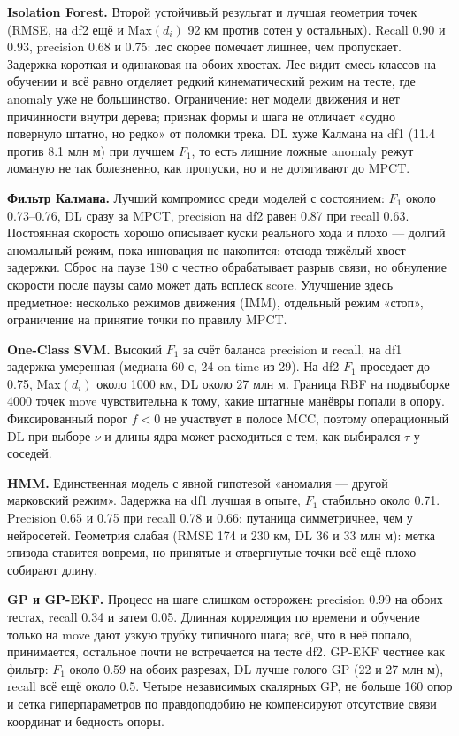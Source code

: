 \documentclass[a4paper,12pt]{report}
\begin{document}
\textbf{Isolation Forest.} Второй устойчивый результат и лучшая геометрия точек (RMSE, на df2 ещё и Max$(d_i)$ 92 км против сотен у остальных). Recall 0.90 и 0.93, precision 0.68 и 0.75: лес скорее помечает лишнее, чем пропускает. Задержка короткая и одинаковая на обоих хвостах. Лес видит смесь классов на обучении и всё равно отделяет редкий кинематический режим на тесте, где anomaly уже не большинство. Ограничение: нет модели движения и нет причинности внутри дерева; признак формы и шага не отличает «судно повернуло штатно, но редко» от поломки трека. DL хуже Калмана на df1 (11.4 против 8.1 млн м) при лучшем $F_1$, то есть лишние ложные anomaly режут ломаную не так болезненно, как пропуски, но и не дотягивают до MPCT.

\textbf{Фильтр Калмана.} Лучший компромисс среди моделей с состоянием: $F_1$ около 0.73–0.76, DL сразу за MPCT, precision на df2 равен 0.87 при recall 0.63. Постоянная скорость хорошо описывает куски реального хода и плохо — долгий аномальный режим, пока инновация не накопится: отсюда тяжёлый хвост задержки. Сброс на паузе 180 с честно обрабатывает разрыв связи, но обнуление скорости после паузы само может дать всплеск score. Улучшение здесь предметное: несколько режимов движения (IMM), отдельный режим «стоп», ограничение на принятие точки по правилу MPCT.

\textbf{One-Class SVM.} Высокий $F_1$ за счёт баланса precision и recall, на df1 задержка умеренная (медиана 60 с, 24 on-time из 29). На df2 $F_1$ проседает до 0.75, Max$(d_i)$ около 1000 км, DL около 27 млн м. Граница RBF на подвыборке 4000 точек move чувствительна к тому, какие штатные манёвры попали в опору. Фиксированный порог $f<0$ не участвует в полосе MCC, поэтому операционный DL при выборе $\nu$ и длины ядра может расходиться с тем, как выбирался $\tau$ у соседей.

\textbf{HMM.} Единственная модель с явной гипотезой «аномалия — другой марковский режим». Задержка на df1 лучшая в опыте, $F_1$ стабильно около 0.71. Precision 0.65 и 0.75 при recall 0.78 и 0.66: путаница симметричнее, чем у нейросетей. Геометрия слабая (RMSE 174 и 230 км, DL 36 и 33 млн м): метка эпизода ставится вовремя, но принятые и отвергнутые точки всё ещё плохо собирают длину.

\textbf{GP и GP-EKF.} Процесс на шаге слишком осторожен: precision 0.99 на обоих тестах, recall 0.34 и затем 0.05. Длинная корреляция по времени и обучение только на move дают узкую трубку типичного шага; всё, что в неё попало, принимается, остальное почти не встречается на тесте df2. GP-EKF честнее как фильтр: $F_1$ около 0.59 на обоих разрезах, DL лучше голого GP (22 и 27 млн м), recall всё ещё около 0.5. Четыре независимых скалярных GP, не больше 160 опор и сетка гиперпараметров по правдоподобию не компенсируют отсутствие связи координат и бедность опоры.
\end{document}

